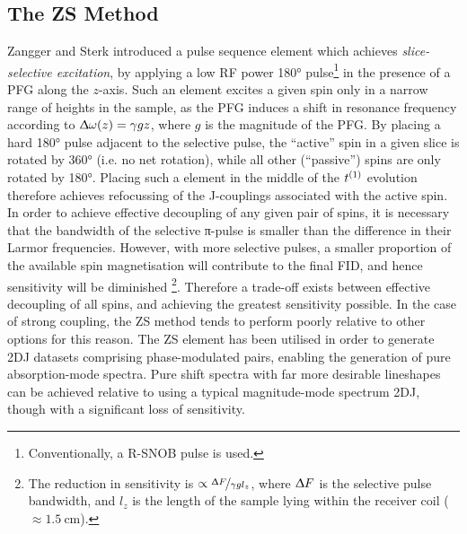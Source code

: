 \subsection{The \acl{ZS} Method}
\label{subsec:ZS}
Zangger and Sterk introduced a pulse sequence element which achieves
\emph{slice-selective excitation}, by applying a low \ac{RF} power \ang{180}
pulse\footnote{Conventionally, a R-SNOB pulse is used\cite{Kupce1995}.} in the
presence of a \ac{PFG} along the $z$-axis\cite{Zangger1997}. Such an element
excites a
given spin only in a narrow range of heights in the sample, as the \ac{PFG}
induces a shift in resonance frequency according to $\Updelta \omega(z) = \gamma
gz$, where $g$ is the magnitude of the \ac{PFG}. By placing a hard
\ang{180} pulse adjacent to the selective pulse, the
``active'' spin in a given slice is rotated by \ang{360} (i.e. no net
rotation), while all other (``passive'') spins are only rotated by \ang{180}.
Placing such a element in the middle of the $t^{(1)}$ evolution therefore
achieves refocussing of the J-couplings associated with the active
spin\cite{Aguilar2010}. In order to achieve effective decoupling of any given
pair of spins, it is necessary that the bandwidth of the selective π-pulse is
smaller than the difference in their Larmor frequencies. However, with more
selective pulses, a smaller proportion of the available spin magnetisation will
contribute to the final FID, and hence sensitivity will be diminished
\footnote{
    The reduction in sensitivity is $\propto \nicefrac{\Updelta F}{\gamma g l_z}$,
    where $\Updelta F$ is the selective pulse bandwidth, and $l_z$ is the length of
    the sample lying within the receiver coil ($\approx
    \qty{1.5}{\centi\meter}$).
}.
Therefore a trade-off exists between effective decoupling of all spins, and
achieving the greatest sensitivity possible. In the case of strong coupling,
the \ac{ZS} method tends to perform poorly relative to other options for this
reason. The \ac{ZS} element has been utilised in order to generate \ac{2DJ}
datasets comprising phase-modulated pairs, enabling the generation of pure
absorption-mode spectra\cite{Pell2007}. Pure shift spectra with far more
desirable lineshapes can be achieved relative to using a typical magnitude-mode
spectrum \ac{2DJ}, though with a significant loss of sensitivity.

